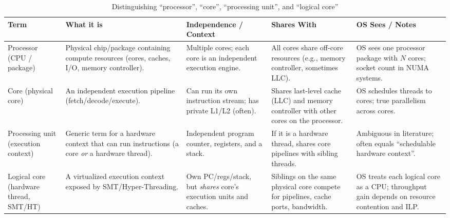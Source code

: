 \documentclass{article}
\begin{document}
\begin{table}[h]
    \centering
    \caption{Distinguishing “processor”, “core”, “processing unit”, and “logical core”}
    \small
    \begin{tabular}{@{}p{2.9cm}p{3.2cm}p{3.8cm}p{3.2cm}p{4.2cm}@{}}
    \toprule
    \textbf{Term} & \textbf{What it is} & \textbf{Independence / Context} & \textbf{Shares With} & \textbf{OS Sees / Notes} \\
    \midrule
    Processor (CPU / package) &
    Physical chip/package containing compute resources (cores, caches, I/O, memory controller). &
    Multiple cores; each core is an independent execution engine. &
    All cores share off-core resources (e.g., memory controller, sometimes LLC). &
    OS sees one processor package with $N$ cores; socket count in NUMA systems. \\
    \addlinespace
    Core (physical core) &
    An independent execution pipeline (fetch/decode/execute). &
    Can run its own instruction stream; has private L1/L2 (often). &
    Shares last-level cache (LLC) and memory controller with other cores on the processor. &
    OS schedules threads to cores; true parallelism across cores. \\
    \addlinespace
    Processing unit (execution context) &
    Generic term for a hardware context that can run instructions (a core \emph{or} a hardware thread). &
    Independent program counter, registers, and a stack. &
    If it is a hardware thread, shares core pipelines with sibling threads. &
    Ambiguous in literature; often equals “schedulable hardware context”. \\
    \addlinespace
    Logical core (hardware thread, SMT/HT) &
    A virtualized execution context exposed by SMT/Hyper-Threading. &
    Own PC/regs/stack, but \emph{shares} core’s execution units and caches. &
    Siblings on the same physical core compete for pipelines, cache ports, bandwidth. &
    OS treats each logical core as a CPU; throughput gain depends on resource contention and ILP. \\
    \bottomrule
    \end{tabular}
    \end{table}
\end{document}
